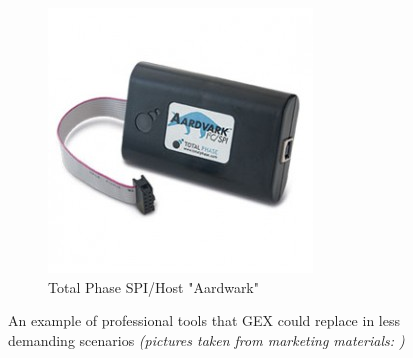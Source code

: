 \begin{figure}[h]
\begin{subfigure}{.5\textwidth}
		\includegraphics[width=.95\linewidth]{img/total-phase-spi-i2c.jpg}
		\caption{Total Phase SPI/\IIC Host "Aardwark"}
	\end{subfigure}
	\caption[Professional tools that GEX can replace]{\label{fig:profidaq}An example of professional tools that GEX could replace in less demanding scenarios \textit{(pictures taken from marketing materials: \cite{nidevice1, nidevice2, tphasedevice})}}
\end{figure}


